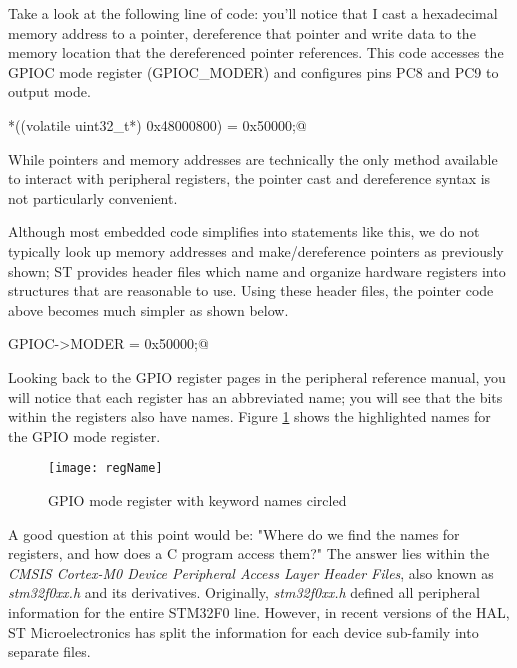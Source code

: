 \documentclass[openany,11pt,fleqn]{book} %
\makeatletter
\newcommand{\ilcode}[1]{
    \begin{center} \parskip=-15pt \colorbox{gray!20!white}{
        \parbox{\columnwidth-2\fboxsep}{
            \lstinline@#1@
        }
    } \end{center}
}
\makeatother
\begin{document}
Take a look at the following line of code: you'll notice that I cast a hexadecimal memory address to a pointer, dereference that pointer and write data to the memory location that the dereferenced pointer references. This code accesses the GPIOC mode register (GPIOC\_MODER) and configures pins PC8 and PC9 to output mode.

\ilcode{*((volatile uint32\_t*) 0x48000800) = 0x50000;}%
\smallskip

While pointers and memory addresses are technically the only method available to interact with peripheral registers, the pointer cast and dereference syntax is not particularly convenient.

Although most embedded code simplifies into statements like this, we do not typically look up memory addresses and make/dereference pointers as previously shown; ST provides header files which name and organize hardware registers into structures that are reasonable to use. Using these header files, the pointer code above becomes much simpler as shown below.

\ilcode{GPIOC->MODER = 0x50000;}%
\smallskip


Looking back to the GPIO register pages in the peripheral reference manual, you will notice that each register has an abbreviated name; you will see that the bits within the registers also have names. Figure \ref{regName} shows the highlighted names for the GPIO mode register. 

\begin{figure}[]
    \centering\texttt{[image: regName]}
    \caption{GPIO mode register with keyword names circled}
    \label{regName}
\end{figure}

A good question at this point would be: "Where do we find the names for registers, and how does a C program access them?" The answer lies within the \textit{CMSIS Cortex-M0 Device Peripheral Access Layer Header Files}, also known as \textit{stm32f0xx.h} and its derivatives. Originally, \textit{stm32f0xx.h} defined all peripheral information for the entire STM32F0 line. However, in recent versions of the HAL, ST Microelectronics has split the information for each device sub-family into separate files. 
\end{document}
